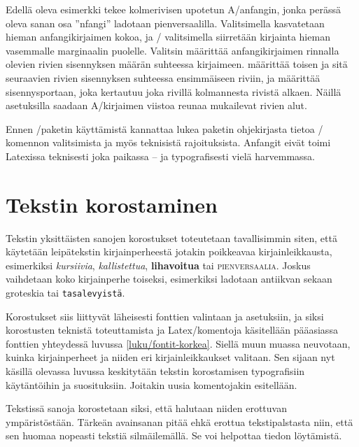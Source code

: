 Edellä oleva esimerkki tekee kolmerivisen upotetun A\-/anfangin, jonka
perässä oleva sanan osa ''nfangi'' ladotaan pienversaalilla.
Valitsimella  kasvatetaan hieman anfangikirjaimen
kokoa, ja \-/ valitsimella siirretään kirjainta hieman
vasemmalle marginaalin puolelle. Valitsin  määrittää
anfangikirjaimen rinnalla olevien rivien sisennyksen määrän suhteessa
kirjaimeen.  määrittää toisen ja sitä seuraavien rivien
sisennyksen suhteessa ensimmäiseen riviin, ja  määrittää
sisennysportaan, joka kertautuu joka rivillä kolmannesta rivistä alkaen.
Näillä asetuksilla saadaan A\-/kirjaimen viistoa reunaa mukailevat
rivien alut.

Ennen \-/paketin käyttämistä kannattaa lukea paketin
ohjekirjasta tietoa \-/ komennon valitsimista ja myös
teknisistä rajoituksista. Anfangit eivät toimi Latexissa teknisesti joka
paikassa -- ja typografisesti vielä harvemmassa.

\section{Tekstin korostaminen}
\label{luku/korostus}

Tekstin yksittäisten sanojen korostukset toteutetaan tavallisimmin
siten, että käytetään leipätekstin kirjainperheestä jotakin poikkeavaa
kirjainleikkausta, esimerkiksi \textit{kursiivia},
\textsl{kallistettua}, \textbf{lihavoitua} tai \textsc{pienversaalia}.
Joskus vaihdetaan koko kirjainperhe toiseksi, esimerkiksi ladotaan
\textrm{antiikvan} sekaan \textsf{groteskia} tai \texttt{tasalevyistä}.

Korostukset siis liittyvät läheisesti fonttien valintaan ja asetuksiin,
ja siksi korostusten teknistä toteuttamista ja Latex\-/komentoja
käsitellään pääasiassa fonttien yhteydessä luvussa
\ref{luku/fontit-korkea}.  Siellä muun muassa neuvotaan,
kuinka kirjainperheet ja niiden eri kirjainleikkaukset valitaan. Sen
sijaan nyt käsillä olevassa luvussa keskitytään tekstin korostamisen
typografisiin käytäntöihin ja suosituksiin. Joitakin uusia komentojakin
esitellään.

Tekstissä sanoja korostetaan siksi, että halutaan niiden erottuvan
ympäristöstään. Tärkeän avainsanan pitää ehkä erottua tekstipalstasta
niin, että sen huomaa nopeasti tekstiä silmäilemällä. Se voi helpottaa
tiedon löytämistä.


